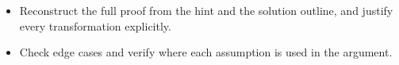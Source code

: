 \begin{takeaways}
\begin{itemize}[leftmargin=*]
\item Reconstruct the full proof from the hint and the solution outline, and justify every transformation explicitly.
\item Check edge cases and verify where each assumption is used in the argument.
\end{itemize}
\end{takeaways}

